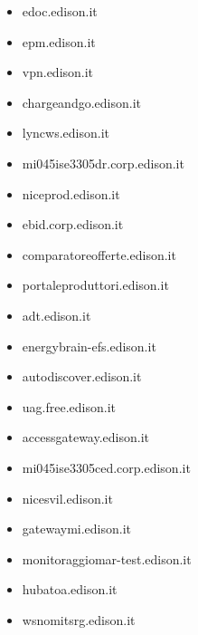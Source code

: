 \documentclass{article}
\begin{document}
\begin{itemize}
            \item edoc.edison.it
        
            \item epm.edison.it
        
            \item vpn.edison.it
        
            \item chargeandgo.edison.it
        
            \item lyncws.edison.it
        
            \item mi045ise3305dr.corp.edison.it
        
            \item niceprod.edison.it
        
            \item ebid.corp.edison.it
        
            \item comparatoreofferte.edison.it
        
            \item portaleproduttori.edison.it
        
            \item adt.edison.it
        
            \item energybrain-efs.edison.it
        
            \item autodiscover.edison.it
        
            \item uag.free.edison.it
        
            \item accessgateway.edison.it
        
            \item mi045ise3305ced.corp.edison.it
        
            \item nicesvil.edison.it
        
            \item gatewaymi.edison.it
        
            \item monitoraggiomar-test.edison.it
        
            \item hubatoa.edison.it
        
            \item wsnomitsrg.edison.it
        

\end{itemize}
\end{document}

